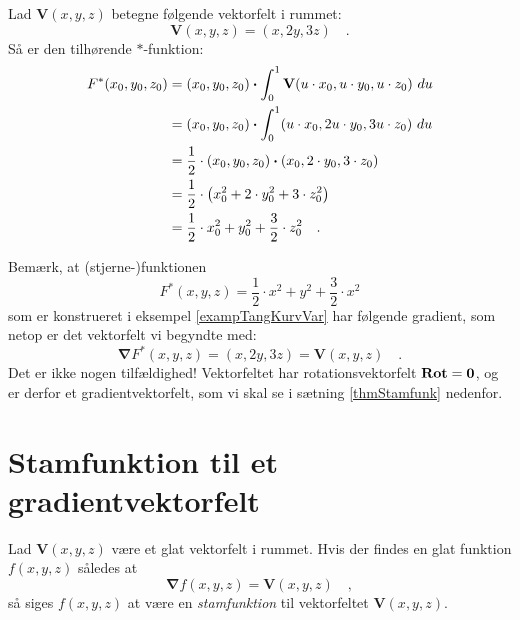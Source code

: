 \begin{example}\label{exampTangKurvVar}
Lad $\mathbf{V}(x,y,z)$ betegne følgende vektorfelt i rummet:
\begin{equation}
\mathbf{V}(x,y,z) = (x, 2y, 3z) \quad .
\end{equation}
Så er den tilhørende $*$-funktion:
\begin{equation}
\begin{aligned}
F^{*}(x_{0}, y_{0}, z_{0}) &= (x_{0}, y_{0}, z_{0}) \bm{\cdot} \int_{0}^{1}{\bf V}(u\cdot x_{0}, u\cdot y_{0}, u\cdot z_{0}) \,\,du  \\
&= (x_{0}, y_{0}, z_{0}) \bm{\cdot} \int_{0}^{1}(u\cdot x_{0}, 2u\cdot y_{0}, 3u\cdot z_{0})\,\,du  \\
&=  \frac{1}{2} \cdot (x_{0}, y_{0}, z_{0}) \bm{\cdot}(x_{0}, 2\cdot y_{0}, 3\cdot z_{0}) \\
&=   \frac{1}{2}\cdot\left(x_{0}^{2} + 2\cdot y_{0}^{2} +  3\cdot z_{0}^{2}\right) \\
&= \frac{1}{2}\cdot x_{0}^{2} +  y_{0}^{2} + \frac{3}{2}\cdot z_{0}^{2} \quad.
\end{aligned}
\end{equation}
\end{example}

\begin{aha}
Bemærk, at (stjerne-)funktionen $$F^{*}(x, y, z) = \frac{1}{2}\cdot x^{2} +  y^{2} + \frac{3}{2}\cdot x^{2}$$ som er konstrueret i
eksempel \ref{exampTangKurvVar} har følgende gradient, som netop er det vektorfelt vi begyndte med:
\begin{equation}
\bm{\nabla}F^{*}(x,y,z)  = (x, 2y, 3z)= \mathbf{V}(x,y,z) \quad.
\end{equation}
Det er ikke nogen tilfældighed! Vektorfeltet har rotationsvektorfelt $\operatorname{\bf{Rot}} = \mathbf{0}$,  og er derfor et gradientvektorfelt, som vi skal se i sætning \ref{thmStamfunk} nedenfor.
\end{aha}

\section{Stamfunktion til et gradientvektorfelt}

\begin{definition} \label{thmStamfunkGradFelt}
Lad $\mathbf{V}(x,y,z)$ være et glat vektorfelt i rummet. Hvis der findes en glat funktion $f(x,y,z)$ således at
\begin{equation}
\bm{\nabla}f(x,y,z) = \mathbf{V}(x,y,z) \quad ,
\end{equation}
så siges $f(x,y,z)$ at være en \emph{stamfunktion} til vektorfeltet $\mathbf{V}(x,y,z)$.
\end{definition}

